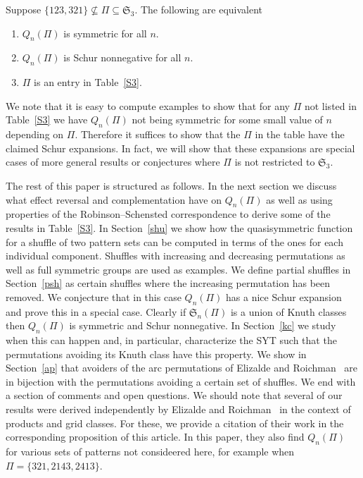 \documentclass[ALCO,ThmDefs,Unicode,epreuves]{cedram}
\newcommand{\sbe}{\subseteq}
\newcommand{\fS}{{\mathfrak S}}
\begin{document}
\goodbreak
\begin{theo}
\label{main}
Suppose $\{123,321\}\not\sbe \Pi\sbe\fS_3$. The following are equivalent
\begin{enumerate}
\item $Q_n(\Pi)$ is symmetric for all $n$.
\item $Q_n(\Pi)$ is Schur nonnegative for all $n$.
\item $\Pi$ is an entry in Table~\ref{S3}.
\end{enumerate}
\end{theo}


We note that it is easy to compute examples to show that for any $\Pi$ not listed in Table~\ref{S3} we have $Q_n(\Pi)$ not being symmetric for some small value of $n$ depending on $\Pi$. Therefore it suffices to show that the $\Pi$ in the table have the claimed Schur expansions. In fact, we will show that these expansions are special cases of more general results or conjectures where $\Pi$ is not restricted to $\fS_3$.

The rest of this paper is structured as follows. In the next section we discuss what effect reversal and complementation have on $Q_n(\Pi)$ as well as using properties of the Robinson--Schensted correspondence to derive some of the results in Table~\ref{S3}. In Section~\ref{shu} we show how the quasisymmetric function for a shuffle of two pattern sets can be computed in terms of the ones for each individual component. Shuffles with increasing and decreasing permutations as well as full symmetric groups are used as examples. We define partial shuffles in Section~\ref{psh} as certain shuffles where the increasing permutation has been removed. We conjecture that in this case $Q_n(\Pi)$ has a nice Schur expansion and prove this in a special case. Clearly if $\fS_n(\Pi)$ is a union of Knuth classes then $Q_n(\Pi)$ is symmetric and Schur nonnegative. In Section~\ref{kc} we study when this can happen and, in particular, characterize the SYT such that the permutations avoiding its Knuth class have this property. We show in Section~\ref{ap} that avoiders of the arc permutations of Elizalde and Roichman~\cite{er:ap,er:sap} are in bijection with the permutations avoiding a certain set of shuffles. We end with a section of comments and open questions. We should note that several of our results were derived independently by Elizalde and Roichman~\cite{er:ssp} in the context of products and grid classes. For these, we provide a citation of their work in the corresponding proposition of this article. In this paper, they also find $Q_n(\Pi)$ for various sets of patterns not consideered here, for example when $\Pi=\{321,2143,2413\}$.
\end{document}
